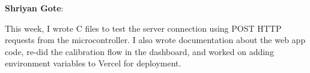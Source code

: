 \documentclass[12pt]{article}
\begin{document}
\noindent\textbf{Shriyan Gote}:

This week, I wrote C files to test the server connection using POST HTTP requests from the microcontroller. I also wrote documentation about the web app code, re-did the calibration flow in the dashboard, and worked on adding environment variables to Vercel for deployment.\\
\end{document}
